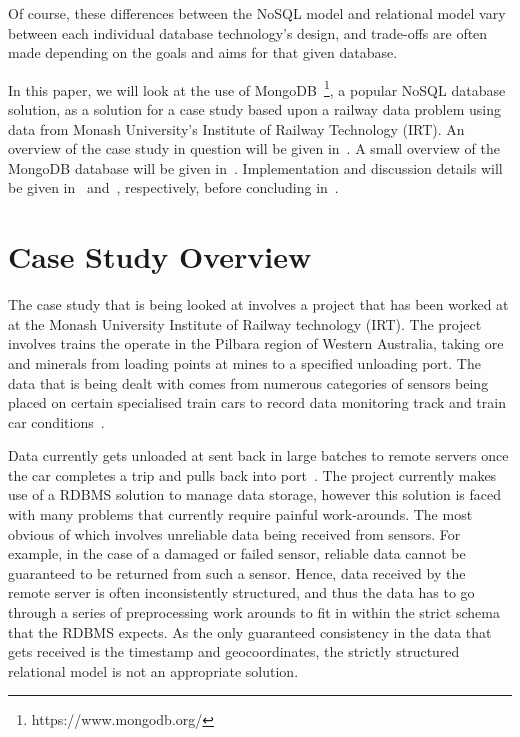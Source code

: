 \documentclass[a4paper,11pt]{article}
\begin{document}
Of course, these differences between the NoSQL model and relational model vary between each individual database
technology's design, and trade-offs are often made depending on the goals and aims for that given database.

In this paper, we will look at the use of MongoDB~\footnote{https://www.mongodb.org/}, a popular NoSQL database solution,
as a solution for a case study based upon a railway data problem using data from Monash University's Institute of Railway
Technology (IRT). An overview of the case study in question will be given in~. A small
overview of the MongoDB database will be given in~. Implementation and
discussion details will be given in~ and~, respectively,
before concluding in~.


\newpage

\section{Case Study Overview} %
\label{sec:case_study_overview}

The case study that is being looked at involves a project that has been worked at at the Monash University Institute of
Railway technology (IRT). The project involves trains the operate in the Pilbara region of Western Australia, taking
ore and minerals from loading points at mines to a specified unloading port. The data that is being dealt with comes from
numerous categories of sensors being placed on certain specialised train cars to record data monitoring track and train
car conditions~\cite{darby2003development,darby2005track}.

Data currently gets unloaded at sent back in large batches to remote servers once the car completes a trip and pulls back
into port~\cite{thomas2012taking}. The project currently makes use of a RDBMS solution to manage data storage, however
this solution is faced with many problems that currently require painful work-arounds. The most obvious of which involves
unreliable data being received from sensors. For example, in the case of a damaged or failed sensor, reliable data cannot
be guaranteed to be returned from such a sensor. Hence, data received by the remote server is often inconsistently
structured, and thus the data has to go through a series of preprocessing work arounds to fit in within the strict
schema that the RDBMS expects. As the only guaranteed consistency in the data that gets received is the timestamp and
geocoordinates, the strictly structured relational model is not an appropriate solution.
\end{document}
